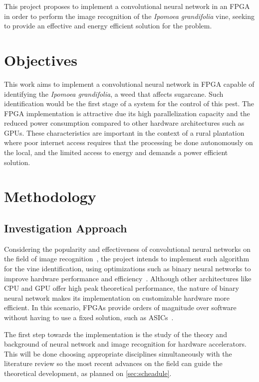 \documentclass[
    12pt,                       %
    oneside,                    %
    a4paper,                    %
    brazil,                     %
    french,                     %
    spanish,                    %
    english,                    %
    ]{abntex2}
\begin{document}
  This project proposes to implement a convolutional neural network in an FPGA in order to perform the image recognition of the \textit{Ipomoea grandifolia} vine, seeking to provide an effective and energy efficient solution for the problem.

\chapter[Objectives]{Objectives}

 This work aims to implement a convolutional neural network in FPGA capable of identifying the \textit{Ipomoea grandifolia}, a weed that affects sugarcane. Such identification would be the first stage of a system for the control of this pest. The FPGA implementation is attractive due its high parallelization capacity and the reduced power consumption compared to other hardware architectures such as GPUs. These characteristics are important in the context of a rural plantation where poor internet access requires that the processing be done  autonomously on the local, and the limited access to energy and demands a power efficient solution.

\chapter[Methodology]{Methodology}
\section{Investigation Approach}

Considering the popularity and effectiveness of convolutional neural networks on the field of image recognition~\cite{LeCun2015}, the project intends to implement such algorithm for the vine identification, using optimizations such as binary neural networks to improve hardware performance and efficiency~\cite{Nurvitadhi2017_0, Courbariaux2015}. Although other architectures like CPU and GPU offer high peak theoretical performance, the nature of binary neural network makes its implementation on customizable hardware more efficient. In this scenario, FPGAs provide orders of magnitude over software without having to use a fixed solution, such as ASICs~\cite{Courbariaux2015}.

The first step towards the implementation is the study of the theory and background of neural network and image recognition for hardware accelerators. This will be done choosing appropriate disciplines simultaneously with the literature review so the most recent advances on the field can guide the theoretical development, as planned on \autoref{sec:scheadule}.
\end{document}
